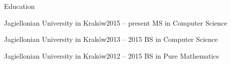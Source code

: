 \documentclass{resume} %
\begin{document}

\begin{rSection}{Education}

\begin{rSubsectionNoTitle}{Jagiellonian University in Kraków}{2015 -- present}
    {MS in Computer Science}
\end{rSubsectionNoTitle}

\begin{rSubsectionNoTitle}{Jagiellonian University in Kraków}{2013 -- 2015}
    {BS in Computer Science}
\end{rSubsectionNoTitle}

\begin{rSubsectionNoTitle}{Jagiellonian University in Kraków}{2012 -- 2015}
    {BS in Pure Mathematics}
\end{rSubsectionNoTitle}

\end{rSection}

\end{document}
